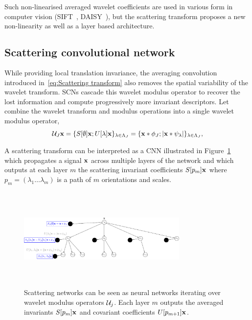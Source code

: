 \documentclass{article}
\begin{document}
    Such non-linearised averaged wavelet coefficients are used in various form in computer vision (SIFT~\cite{}, DAISY~\cite{}), but the scattering transform proposes a new non-linearity as well as a layer based architecture.
  
  \subsection{Scattering convolutional network}
    \label{subsec:SCN/SCN}
    
    While providing local translation invariance, the averaging convolution introduced in~\ref{eq:Scattering transform} also removes the spatial variability of the wavelet transform. SCNs cascade this wavelet modulus operator to recover the lost information and compute progressively more invariant descriptors. Let combine the wavelet transform and modulus operations into a single wavelet modulus operator,
    \vspace{-5pt}
    \begin{equation}
      \mathcal{U}_{J} {\bf x} = \{ S[\emptyset] {\bf x} ; U[\lambda]{\bf x} \}_{\lambda \in \Lambda_{J}} 
		      = \{ {\bf x} \ast \phi_{J}; \left| {\bf x} \ast \psi_{\lambda} \right| \}_{\lambda \in \Lambda_{J}},
      \label{eq:One step propagator}
    \end{equation}
    
    A scattering transform can be interpreted as a CNN illustrated in Figure~\ref{fig:SCN 1}~\cite{Deep Roto-Translation Scattering for Object Classification} which propagates a signal ${\bf x}$ across multiple layers of the network and which outputs at each layer $m$ the scattering invariant coefficients $S[p_{m}]{\bf x}$ where $p_{m}=(\lambda_{1} \dots \lambda_{m})$ is a path of $m$ orientations and scales.
    
    \begin{figure}
      \begin{center}
				\includegraphics[width=3.3in, height=2in, keepaspectratio]{ST_freqDec_crop.pdf}
				\caption[Scattering convolution network.]{\centering  Scattering networks can be seen as neural networks iterating over wavelet  modulus  operators $\mathcal{U}_{j}$. Each layer $m$ outputs the averaged  invariants $S[p_{m}]{\bf x}$ and covariant coefficients $U[p_{m+1}]{\bf x}$.}
				\label{fig:SCN 1}
      \end{center}
      \vspace{-15pt}
    \end{figure}
    
\end{document}
